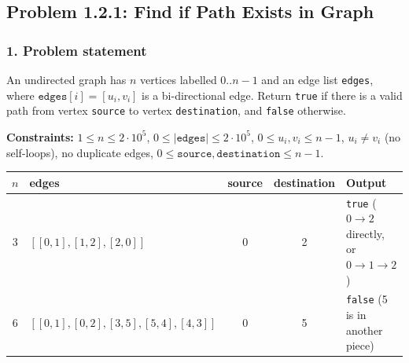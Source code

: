 \subsection{Problem 1.2.1: Find if Path Exists in Graph}


\subsubsection*{1. Problem statement}

An undirected graph has $n$ vertices labelled $0..n-1$ and an edge list \texttt{edges}, where $\texttt{edges}[i] = [u_i, v_i]$ is a bi-directional edge. Return \texttt{true} if there is a valid path from vertex \texttt{source} to vertex \texttt{destination}, and \texttt{false} otherwise.

\textbf{Constraints:} $1 \le n \le 2\cdot 10^5$, \; $0 \le |\texttt{edges}| \le 2\cdot 10^5$, \; $0 \le u_i, v_i \le n-1$, \; $u_i \ne v_i$ (no self-loops), no duplicate edges, $0 \le \texttt{source}, \texttt{destination} \le n-1$.

\begin{table}[H]
\centering\small
\begin{tabular}{@{}clccl@{}}
\toprule
$n$ & \textbf{edges} & \textbf{source} & \textbf{destination} & \textbf{Output} \\
\midrule
3 & $[[0,1],[1,2],[2,0]]$ & 0 & 2 & \texttt{true} \quad ($0 \to 2$ directly, or $0 \to 1 \to 2$) \\
6 & $[[0,1],[0,2],[3,5],[5,4],[4,3]]$ & 0 & 5 & \texttt{false} \quad (5 is in another piece) \\
\bottomrule
\end{tabular}
\end{table}

